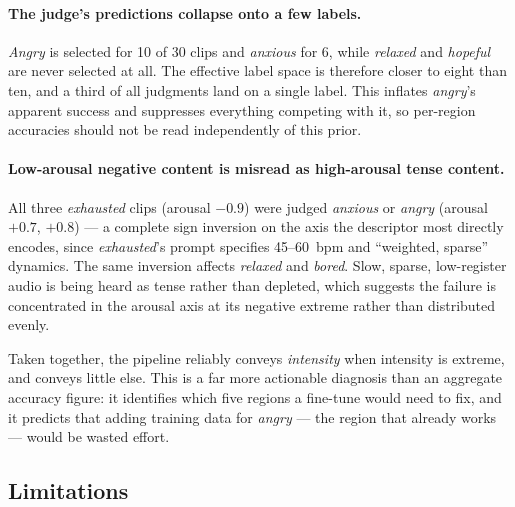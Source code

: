 \documentclass[11pt]{article}
\begin{document}
\paragraph{The judge's predictions collapse onto a few labels.} \emph{Angry} is selected for 10 of 30 clips and \emph{anxious} for 6, while \emph{relaxed} and \emph{hopeful} are never selected at all. The effective label space is therefore closer to eight than ten, and a third of all judgments land on a single label. This inflates \emph{angry}'s apparent success and suppresses everything competing with it, so per-region accuracies should not be read independently of this prior.

\paragraph{Low-arousal negative content is misread as high-arousal tense content.} All three \emph{exhausted} clips (arousal $-0.9$) were judged \emph{anxious} or \emph{angry} (arousal $+0.7$, $+0.8$) --- a complete sign inversion on the axis the descriptor most directly encodes, since \emph{exhausted}'s prompt specifies 45--60~bpm and ``weighted, sparse'' dynamics. The same inversion affects \emph{relaxed} and \emph{bored}. Slow, sparse, low-register audio is being heard as tense rather than depleted, which suggests the failure is concentrated in the arousal axis at its negative extreme rather than distributed evenly.

Taken together, the pipeline reliably conveys \emph{intensity} when intensity is extreme, and conveys little else. This is a far more actionable diagnosis than an aggregate accuracy figure: it identifies which five regions a fine-tune would need to fix, and it predicts that adding training data for \emph{angry} --- the region that already works --- would be wasted effort.

\subsection{Limitations}
\label{sec:eval-limits}
\end{document}
